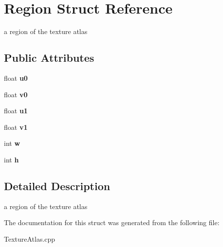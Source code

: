\hypertarget{struct_region}{\section{Region Struct Reference}
\label{struct_region}
}


a region of the texture atlas  


\subsection*{Public Attributes}
\begin{DoxyCompactItemize}
\item 
\hypertarget{struct_region_ab3a84ba2dfaba1e48bae988a5b0110fc}{float {\bfseries u0}}\label{struct_region_ab3a84ba2dfaba1e48bae988a5b0110fc}

\item 
\hypertarget{struct_region_ae1f101f8c555d1ca72b9c0088d22da58}{float {\bfseries v0}}\label{struct_region_ae1f101f8c555d1ca72b9c0088d22da58}

\item 
\hypertarget{struct_region_ac90f80b38908b321730bebfe13bd1899}{float {\bfseries u1}}\label{struct_region_ac90f80b38908b321730bebfe13bd1899}

\item 
\hypertarget{struct_region_a6c63e8a1907ece81277cdf737f709c7d}{float {\bfseries v1}}\label{struct_region_a6c63e8a1907ece81277cdf737f709c7d}

\item 
\hypertarget{struct_region_a698ecc023295bbb19f7a05729b22d1f3}{int {\bfseries w}}\label{struct_region_a698ecc023295bbb19f7a05729b22d1f3}

\item 
\hypertarget{struct_region_a3be01083660b1aad6276e5406a39b213}{int {\bfseries h}}\label{struct_region_a3be01083660b1aad6276e5406a39b213}

\end{DoxyCompactItemize}


\subsection{Detailed Description}
a region of the texture atlas 

The documentation for this struct was generated from the following file\-:\begin{DoxyCompactItemize}
\item 
Texture\-Atlas.\-cpp\end{DoxyCompactItemize}
